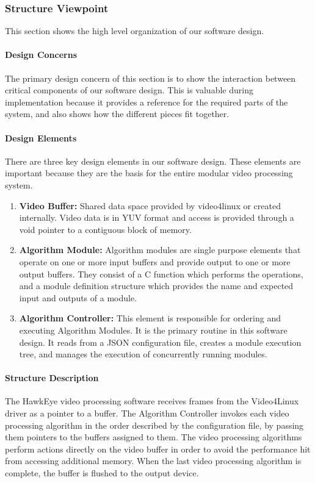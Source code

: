 \subsubsection{Structure Viewpoint}
This section shows the high level organization of our software design.  
	\paragraph{Design Concerns}
	The primary design concern of this section is to show the interaction between critical components of our software design. This is valuable during implementation because it provides a reference for the required parts of the system, and also shows how the different pieces fit together.\\
	\paragraph{Design Elements}
	There are three key design elements in our software design. These elements are important because they are the basis for the entire modular video processing system.\\
	
	\begin{enumerate}[leftmargin=2cm,labelindent=2cm]
	\item \textbf{Video Buffer:}
	Shared data space provided by video4linux or created internally. Video data is in YUV format and access is provided through a void pointer to a 	contiguous block of memory.
	\item \textbf{Algorithm Module:} 
	Algorithm modules are single purpose elements that operate on one or more input buffers and provide output to one or more output buffers. They 	consist of a C function which performs the operations, and a module definition structure which provides the name and expected input and outputs 	of a module. 
	\item \textbf{Algorithm Controller:}
	This element is responsible for ordering and executing Algorithm Modules. It is the primary routine in this software design. It reads from a JSON 	configuration file, creates a module execution tree, and manages the execution of concurrently running modules.\\
	\end{enumerate}
	
	\paragraph{Structure Description}
	The HawkEye video processing software receives frames from the Video4Linux driver as a pointer to a buffer. The Algorithm Controller invokes each video processing algorithm in the order described by the configuration file, by passing them pointers to the buffers assigned to them. The video processing algorithms perform actions directly on the video buffer in order to avoid the performance hit from accessing additional memory. When the last video processing algorithm is complete, the buffer is flushed to the output device.\\
	
